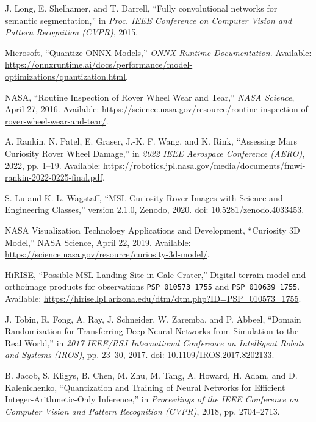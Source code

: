 J. Long, E. Shelhamer, and T. Darrell,
``Fully convolutional networks for semantic segmentation,''
in \emph{Proc. IEEE Conference on Computer Vision and Pattern Recognition
    (CVPR)}, 2015.

Microsoft,
``Quantize ONNX Models,''
\textit{ONNX Runtime Documentation}.
Available: \url{https://onnxruntime.ai/docs/performance/model-optimizations/quantization.html}.

NASA,
``Routine Inspection of Rover Wheel Wear and Tear,''
\textit{NASA Science}, April 27, 2016.
Available:
\url{https://science.nasa.gov/resource/routine-inspection-of-rover-wheel-wear-and-tear/}.

A. Rankin, N. Patel, E. Graser, J.-K. F. Wang, and K. Rink,
``Assessing Mars Curiosity Rover Wheel Damage,''
in \textit{2022 IEEE Aerospace Conference (AERO)},
2022, pp. 1--19.
Available:
\url{https://robotics.jpl.nasa.gov/media/documents/fmwi-rankin-2022-0225-final.pdf}.

S. Lu and K. L. Wagstaff,
``MSL Curiosity Rover Images with Science and Engineering Classes,''
version 2.1.0, Zenodo, 2020.
doi: 10.5281/zenodo.4033453.

NASA Visualization Technology Applications and Development,
``Curiosity 3D Model,''
NASA Science, April 22, 2019.
Available: \url{https://science.nasa.gov/resource/curiosity-3d-model/}.

HiRISE,
``Possible MSL Landing Site in Gale Crater,''
Digital terrain model and orthoimage products for observations
\texttt{PSP\_010573\_1755} and \texttt{PSP\_010639\_1755}.
Available: \url{https://hirise.lpl.arizona.edu/dtm/dtm.php?ID=PSP_010573_1755}.

J. Tobin, R. Fong, A. Ray, J. Schneider, W. Zaremba, and P. Abbeel,
``Domain Randomization for Transferring Deep Neural Networks
from Simulation to the Real World,''
in \emph{2017 IEEE/RSJ International Conference on Intelligent
    Robots and Systems (IROS)}, pp. 23--30, 2017.
doi: \href{https://doi.org/10.1109/IROS.2017.8202133}
{10.1109/IROS.2017.8202133}.

B. Jacob, S. Kligys, B. Chen, M. Zhu, M. Tang, A. Howard,
H. Adam, and D. Kalenichenko,
``Quantization and Training of Neural Networks for Efficient
Integer-Arithmetic-Only Inference,''
in \textit{Proceedings of the IEEE Conference on Computer Vision
    and Pattern Recognition (CVPR)}, 2018, pp. 2704--2713.

